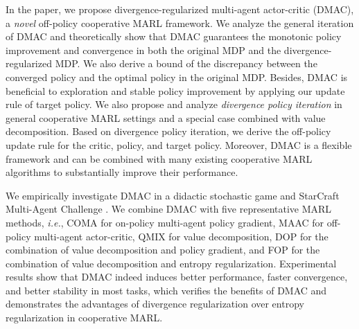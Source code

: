 \documentclass{article}
\begin{document}
In the paper, we propose divergence-regularized multi-agent actor-critic (DMAC), a \textit{novel} off-policy cooperative MARL framework. We analyze the general iteration of DMAC and theoretically show that DMAC guarantees the monotonic policy improvement and convergence in both the original MDP and the divergence-regularized MDP. We also derive a bound of the discrepancy between the converged policy and the optimal policy in the original MDP. Besides, DMAC is beneficial to exploration and stable policy improvement by applying our update rule of target policy. We also propose and analyze \textit{divergence policy iteration} in general cooperative MARL settings and a special case combined with value decomposition. Based on divergence policy iteration, we derive the off-policy update rule for the critic, policy, and target policy.  Moreover, DMAC is a flexible framework and can be combined with many existing cooperative MARL algorithms to substantially improve their performance.


We empirically investigate DMAC in a didactic stochastic game and StarCraft Multi-Agent Challenge \citep{SMAC}. We combine DMAC with five representative MARL methods, \textit{i.e.}, COMA \citep{COMA} for on-policy multi-agent policy gradient, MAAC \citep{MAAC} for off-policy multi-agent actor-critic, QMIX \citep{QMIX} for value decomposition, DOP \citep{DOP} for the combination of value decomposition and policy gradient, and FOP \citep{FOP} for the combination of value decomposition and entropy regularization. Experimental results show that DMAC indeed induces better performance, faster convergence, and better stability in most tasks, which verifies the benefits of DMAC and demonstrates the advantages of divergence regularization over entropy regularization in cooperative MARL.
\end{document}
